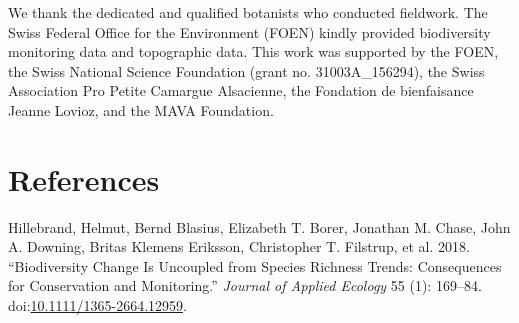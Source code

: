 \documentclass[fleqn,10pt,lineno]{wlpeerj} %
\theoremstyle{definition}
\theoremstyle{definition}
\theoremstyle{definition}
\theoremstyle{remark}
\begin{document}
We thank the dedicated and qualified botanists who conducted fieldwork.
The Swiss Federal Office for the Environment (FOEN) kindly provided
biodiversity monitoring data and topographic data. This work was
supported by the FOEN, the Swiss National Science Foundation (grant no.
31003A\_156294), the Swiss Association Pro Petite Camargue Alsacienne,
the Fondation de bienfaisance Jeanne Lovioz, and the MAVA Foundation.

\section*{References}\label{references}

\hypertarget{refs}{}
\hypertarget{ref-Hillebrand2018}{}
Hillebrand, Helmut, Bernd Blasius, Elizabeth T. Borer, Jonathan M.
Chase, John A. Downing, Britas Klemens Eriksson, Christopher T.
Filstrup, et al. 2018. ``Biodiversity Change Is Uncoupled from Species
Richness Trends: Consequences for Conservation and Monitoring.''
\emph{Journal of Applied Ecology} 55 (1): 169--84.
doi:\href{https://doi.org/10.1111/1365-2664.12959}{10.1111/1365-2664.12959}.
\end{document}

